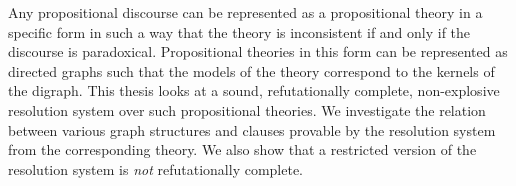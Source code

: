 Any propositional discourse can be represented as a propositional theory in a specific form in such a way that the theory is inconsistent if and only if the discourse is paradoxical.
Propositional theories in this form can be represented as directed graphs such that the models of the theory correspond to the kernels of the digraph.
This thesis looks at a sound, refutationally complete, non-explosive resolution system over such propositional theories.
We investigate the relation between various graph structures and clauses provable by the resolution system from the corresponding theory.
We also show that a restricted version of the resolution system is \textit{not} refutationally complete.
